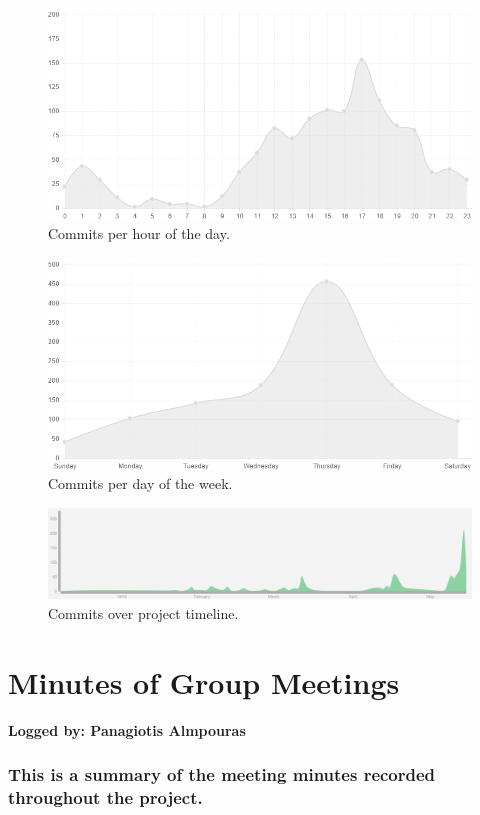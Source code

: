 \documentclass[a4paper,11pt]{article}
\begin{document}
\begin{figure}[H]
\centering
\includegraphics[scale = 0.4]{commits_per_day_hour}
\caption{Commits per hour of the day.}
\end{figure}
\begin{figure}[H]
\centering
\includegraphics[scale = 0.4]{commits_per_weekday}
\caption{Commits per day of the week.}
\end{figure}
\begin{figure}[H]
\centering
\includegraphics[scale = 0.4]{git_graph}
\caption{Commits over project timeline.}
\end{figure}
\clearpage

\section{Minutes of Group Meetings}
\textbf{Logged by: Panagiotis Almpouras}
\subsubsection*{This is a summary of the meeting minutes recorded throughout the project.}
\maketitle
\end{document}
